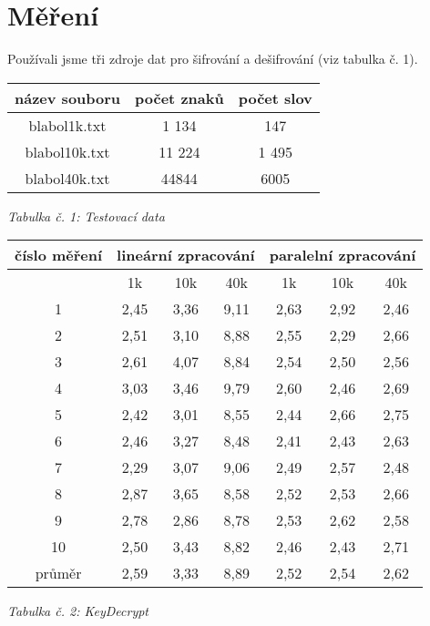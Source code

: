 \documentclass{article}
\begin{document}
\section{Měření}
Používali jsme tři zdroje dat pro šifrování a dešifrování (viz tabulka č. 1).
\begin{center}
	\begin{tabular}{ c | c | c }
	  \textbf{název souboru} & \textbf{počet znaků} & \textbf{počet slov} \\
	  \hline
	  \hline
	  blabol1k.txt & 1 134 & 147 \\
	  \hline
	  blabol10k.txt & 11 224 & 1 495 \\
	  \hline
	  blabol40k.txt & 44844 & 6005 \\
	  \hline
	\end{tabular}
	\newline
	\textit{Tabulka č. 1: Testovací data}
\end{center}


\begin{center}
	\begin{tabular}{ c | c | c | c | c | c | c }
		\textbf{číslo měření} & \multicolumn{3}{c|}{\textbf{lineární zpracování}} & \multicolumn{3}{|c}{\textbf{paralelní zpracování}} \\
		\hline
		& 1k & 10k & 40k & 1k & 10k & 40k \\
		\hline
		\hline
		1 & 2,45 & 3,36 & 9,11 & 2,63 & 2,92 & 2,46 \\
		\hline
		2 & 2,51 & 3,10 & 8,88 & 2,55 & 2,29 & 2,66 \\
		\hline
		3 & 2,61 & 4,07 & 8,84 & 2,54 & 2,50 & 2,56 \\
		\hline
		4 & 3,03 & 3,46 & 9,79 & 2,60 & 2,46 & 2,69 \\
		\hline
		5 & 2,42 & 3,01 & 8,55 & 2,44 & 2,66 & 2,75 \\
		\hline
		6 & 2,46 & 3,27 & 8,48 & 2,41 & 2,43 & 2,63 \\
		\hline
		7 & 2,29 & 3,07 & 9,06 & 2,49 & 2,57 & 2,48 \\
		\hline
		8 & 2,87 & 3,65 & 8,58 & 2,52 & 2,53 & 2,66 \\
		\hline
		9 & 2,78 & 2,86 & 8,78 & 2,53 & 2,62 & 2,58 \\
		\hline
		10 & 2,50 & 3,43 & 8,82 & 2,46 & 2,43 & 2,71 \\
		\hline
		průměr & 2,59 & 3,33 & 8,89 & 2,52 & 2,54 & 2,62 \\
	\end{tabular}
	\newline
	\textit{Tabulka č. 2: KeyDecrypt}
\end{center}
\end{document}

